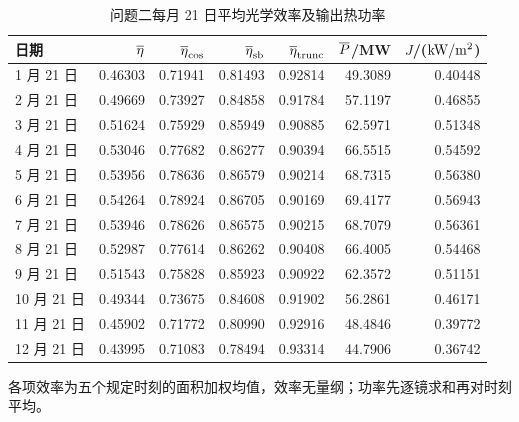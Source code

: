 \begin{table}[H]
\centering\small
\caption{问题二每月 21 日平均光学效率及输出热功率}\label{tab:q2month}
\begin{tabular}{lrrrrrr}
\toprule
日期 & $\overline{\eta}$ & $\overline{\eta}_{\rm cos}$ & $\overline{\eta}_{\rm sb}$ & $\overline{\eta}_{\rm trunc}$ & $\overline{P}$/MW & $J$/($\mathrm{kW}/\mathrm{m}^{2}$)\\\midrule
1 月 21 日 & 0.46303 & 0.71941 & 0.81493 & 0.92814 & 49.3089 & 0.40448\\
2 月 21 日 & 0.49669 & 0.73927 & 0.84858 & 0.91784 & 57.1197 & 0.46855\\
3 月 21 日 & 0.51624 & 0.75929 & 0.85949 & 0.90885 & 62.5971 & 0.51348\\
4 月 21 日 & 0.53046 & 0.77682 & 0.86277 & 0.90394 & 66.5515 & 0.54592\\
5 月 21 日 & 0.53956 & 0.78636 & 0.86579 & 0.90214 & 68.7315 & 0.56380\\
6 月 21 日 & 0.54264 & 0.78924 & 0.86705 & 0.90169 & 69.4177 & 0.56943\\
7 月 21 日 & 0.53946 & 0.78626 & 0.86575 & 0.90215 & 68.7079 & 0.56361\\
8 月 21 日 & 0.52987 & 0.77614 & 0.86262 & 0.90408 & 66.4005 & 0.54468\\
9 月 21 日 & 0.51543 & 0.75828 & 0.85923 & 0.90922 & 62.3572 & 0.51151\\
10 月 21 日 & 0.49344 & 0.73675 & 0.84608 & 0.91902 & 56.2861 & 0.46171\\
11 月 21 日 & 0.45902 & 0.71772 & 0.80990 & 0.92916 & 48.4846 & 0.39772\\
12 月 21 日 & 0.43995 & 0.71083 & 0.78494 & 0.93314 & 44.7906 & 0.36742\\
\bottomrule
\end{tabular}
\par\vspace{3pt}\begin{minipage}{.95\linewidth}\footnotesize 各项效率为五个规定时刻的面积加权均值，效率无量纲；功率先逐镜求和再对时刻平均。\end{minipage}
\end{table}
